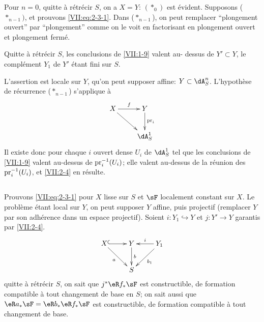 Pour $n=0$, quitte à rétrécir $S$, on a $X=Y$: $(\ast_0)$ est évident. 
Supposons ($\ast_{n-1})$, et prouvons \eqref{VII:eq:2-3-1}. Dans 
($\ast_{n-1}$), on peut remplacer ``plongement ouvert'' par ``plongement'' 
comme on le voit en factorisant en plongement ouvert et plongement fermé. 





\begin{lemma_}\label{VII:2-4}
Quitte à rétrécir $S$, les conclusions de \ref{VII:1-9} valent au-
dessus de $Y'\subset Y$, le complément $Y_1$ de $Y'$ étant fini sur $S$. 
\end{lemma_}

L'assertion est locale sur $Y$, qu'on peut supposer affine: $Y\subset \dA_S^n$. 
L'hypothèse de récurrence ($\ast_{n-1}$) s'applique à 
\[\xymatrix{
  X \ar[r]^-f \ar[dr] 
    & Y \ar[d]^-{\pr_i} \\
  & \dA_S^1 
}\]
Il existe donc pour chaque $i$ ouvert dense $U_i$ de $\dA_S^1$ tel que les 
conclusions de \ref{VII:1-9} valent au-dessus de $\mathrm{pr}_i^{-1}(U_i)$; elle valent 
au-dessus de la réunion des $\mathrm{pr}_i^{-1}(U_i)$, et \ref{VII:2-4} en résulte. 





\addtocounter{subsection}{1} %
\subsection{}\label{VII:2-6}

Prouvons \eqref{VII:eq:2-3-1} pour $X$ lisse sur $S$ et $\sF$ localement 
constant sur $X$. Le problème étant local sur $Y$, on peut supposer $Y$ 
affine, puis projectif (remplacer $Y$ par son adhérence dans un espace 
projectif). Soient $i:Y_1\hookrightarrow Y$ et $j:Y' \to Y$ garantis par 
\ref{VII:2-4}. 
\[\xymatrix{
  X \ar@{^{(}->}[r] \ar[dr]_-a 
    & Y \ar[d]^-b 
    & \ar[l]_-i \ar[dl]^-{b_1} Y_1 \\
  & S 
}\] 
quitte à rétrécir $S$, on sait que $j^\ast \eR f_\ast \sF$ est 
constructible, de formation compatible à tout changement de base en $S$; on 
sait aussi que $\eR a_\ast \sF = \eR b_\ast \eR f_\ast \sF$ est constructible, 
de formation compatible à tout changement de base. 

